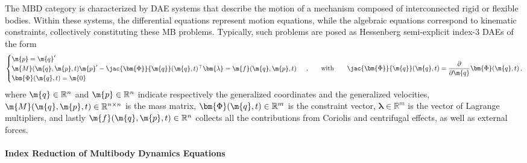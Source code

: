 The \ac{MBD} category is characterized by \ac{DAE} systems that describe the motion of a mechanism composed of interconnected rigid or flexible bodies. Within these systems, the differential equations represent motion equations, while the algebraic equations correspond to kinematic constraints, collectively constituting these \ac{MB} problems. Typically, such problems are posed as Hessenberg semi-explicit index-3 \acp{DAE} of the form
%
\begin{equation}
  \begin{cases}
    \m{p} = \m{q}^{\prime} \\
    \m{M}(\m{q}, \m{p}, t)\m{p}^{\prime} - \jac{\bm{\Phi}}{\m{q}}(\m{q}, t)^{\top}\bm{\lambda} = \m{f}(\m{q}, \m{p} ,t) \\
    \bm{\Phi}(\m{q}, t) = \m{0}
  \end{cases} \, \text{,}
  \qquad \text{with} \qquad \jac{\bm{\Phi}}{\m{q}}(\m{q}, t) = \dfrac{\partial}{\partial\m{q}}\bm{\Phi}(\m{q}, t)
  \, \text{,}
  \label{chap4:eq:mbd_fo}
\end{equation}
%
where $\m{q} \in \mathbb{R}^{n}$ and $\m{p} \in \mathbb{R}^{n}$ indicate respectively the generalized coordinates and the generalized velocities, $\m{M}(\m{q}, \m{p}, t) \in \mathbb{R}^{n\times n}$ is the mass matrix, $\bm{\Phi}(\m{q}, t) \in \mathbb{R}^{m}$ is the constraint vector, $\bm{\lambda} \in \mathbb{R}^{m}$ is the vector of Lagrange multipliers, and lastly $\m{f}(\m{q}, \m{p}, t) \in \mathbb{R}^{n}$ collects all the contributions from Coriolis and centrifugal effects, as well as external forces.

\paragraph{Index Reduction of Multibody Dynamics Equations}

